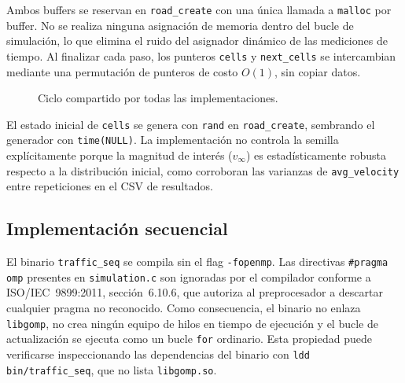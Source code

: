 Ambos buffers se reservan en \texttt{road\_create} con una única llamada a
\texttt{malloc} por buffer. No se realiza ninguna asignación de memoria
dentro del bucle de simulación, lo que elimina el ruido del asignador
dinámico de las mediciones de tiempo. Al finalizar cada paso, los
punteros \texttt{cells} y \texttt{next\_cells} se intercambian mediante
una permutación de punteros de costo $O(1)$, sin copiar datos.

\begin{figure}[H]
\centering
{}
\caption{Ciclo compartido por todas las implementaciones.}
\label{fig:flujo_paso}
\end{figure}

El estado inicial de \texttt{cells} se genera con \texttt{rand} en
\texttt{road\_create}, sembrando el generador con \texttt{time(NULL)}.
La implementación no controla la semilla explícitamente porque la magnitud
de interés ($v_\infty$) es estadísticamente robusta respecto a la
distribución inicial, como corroboran las varianzas de
\texttt{avg\_velocity} entre repeticiones en el CSV de resultados.

\subsection{Implementación secuencial}

El binario \texttt{traffic\_seq} se compila sin el flag \texttt{-fopenmp}.
Las directivas \texttt{\#pragma omp} presentes en \texttt{simulation.c}
son ignoradas por el compilador conforme a ISO/IEC~9899:2011,
sección~6.10.6, que autoriza al preprocesador a descartar cualquier pragma
no reconocido. Como consecuencia, el binario no enlaza \texttt{libgomp},
no crea ningún equipo de hilos en tiempo de ejecución y el bucle de
actualización se ejecuta como un bucle \texttt{for} ordinario. Esta
propiedad puede verificarse inspeccionando las dependencias del binario con
\texttt{ldd bin/traffic\_seq}, que no lista \texttt{libgomp.so}.

